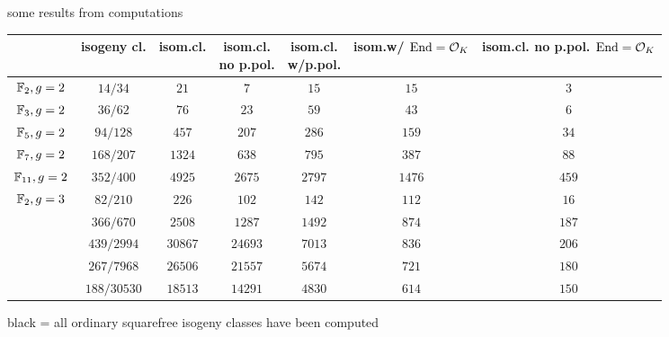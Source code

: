 \documentclass{beamer}
\begin{document}
\begin{frame}{some results from computations}{}
  {\footnotesize
  \begin{tabular}{| c | c | c | c | c | c | c |}
  \hline
		& isogeny cl.     & isom.cl.     & \parbox{3.6 em}{isom.cl.\\no p.pol.} & \parbox{3.7 em}{isom.cl.\\w/p.pol.} & \parbox{3.3 em}{isom.w/\\${\operatorname{End}={\mathcal O}_K}$} & \parbox{3.6 em}{isom.cl.\\no p.pol.\\${\operatorname{End}={\mathcal O}_K}$}\\\hline
     $\mathbb{F}_2,g=2$ & $14/34$         & $21$	  & $7$ 	       & $15$	& $15$	& $3$ \\\hline     
     $\mathbb{F}_3,g=2$ & $36/62$         & $76$	  & $23$ 	       & $59$	& $43$	& $6$\\\hline
     $\mathbb{F}_5,g=2$ & $94/128$        & $457$	  & $207$ 	       & $286$	& $159$	& $34$\\\hline
     $\mathbb{F}_7,g=2$ & $168/207$       & $1324$  	  & $638$ 	       & $795$	& $387$	& $88$\\\hline
     $\mathbb{F}_{11},g=2$ & $352/400$    & $4925$  	  & $2675$ 	       & $2797$	& $1476$& $459$\\\hline
     $\mathbb{F}_2,g=3$ & $82/210$        & $226$	  & $102$ 	       & $142$	& $112$	& $16$\\\hline
{}& $366/670$	  & $2508$  	  & $1287$	       & $1492$	& $874$	& $187$\\\hline     
{}& $439/2994$	  & $30867$	  & $24693$ 	       & $7013$	& $836$	& $206$\\\hline     
{}& $267/7968$	  & $26506$  	  & $21557$ 	       & $5674$	& $721$	& $180$\\\hline     
{}& $188/30530$  & $18513$ & $14291$	       & $4830$	& $614$	& $150$\\\hline
  \end{tabular}
  }\vspace{1 em}

  black = all ordinary squarefree isogeny classes have been computed
  
\end{frame}
\end{document}
